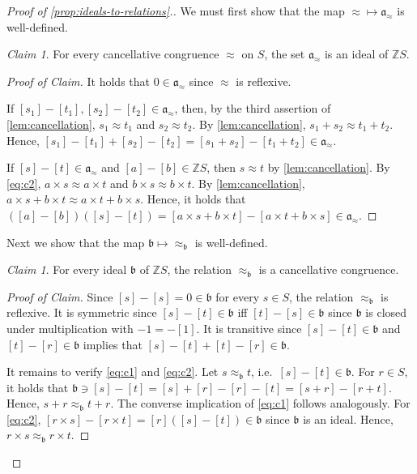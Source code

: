 \documentclass[11pt]{scrartcl}
\theoremstyle{definition}
\theoremstyle{plain}
\theoremstyle{remark}
\newtheorem{claim}[definition]{Claim}
\newenvironment{claimproof}[1][Proof of Claim]{\begin{proof}[#1] \renewcommand{\qedsymbol}{$\lrcorner$}}{ \end{proof}}
\begin{document}
	\begin{proof}[Proof of \cref{prop:ideals-to-relations}.]
		We must first show that the map  ${\approx} \mapsto \mathfrak{a}_{\approx }$ is well-defined.
		\begin{claim}
			For every cancellative congruence $\approx$ on $S$,
			the set $\mathfrak{a}_{\approx}$ is an ideal of $\mathbb{Z}S$.
		\end{claim}
		\begin{claimproof}
			It holds that $0 \in \mathfrak{a}_{\approx}$ since $\approx$ is reflexive. 

			If $[s_1] - [t_1], [s_2] - [t_2] \in \mathfrak{a}_{\approx}$,
			then, by the third assertion of \cref{lem:cancellation}, 
			$s_1 \approx t_1$ and $s_2 \approx t_2$.
			By \cref{lem:cancellation},
			$s_1 + s_2 \approx t_1 + t_2$.
			Hence, $[s_1] - [t_1]+ [s_2] - [t_2] = [s_1 + s_2] - [t_1 + t_2] \in \mathfrak{a}_{\approx}$.

			If $[s] - [t] \in \mathfrak{a}_{\approx}$
			and $[a] - [b] \in \mathbb{Z}S$,
			then $s \approx t$ by \cref{lem:cancellation}.
			By \eqref{eq:c2},
			$a \times s \approx a \times t$
			and 
			$b \times s \approx b \times t$.
			By \cref{lem:cancellation},
			\(
			a\times s + b \times t \approx a \times t + b \times s.
			\)
			Hence, it holds that
			$([a] - [b]) ([s] - [t]) = [a \times s + b \times t ] -  [a \times t + b \times s ] \in \mathfrak{a}_\approx$.
		\end{claimproof}

		Next we show that the map  $\mathfrak{b} \mapsto {\approx_{\mathfrak{b}}}$ is well-defined.
		
		\begin{claim}\label{claim:ideal-to-relation}
			For every ideal $\mathfrak{b}$ of $\mathbb{Z}S$,
			the relation $\approx_{\mathfrak{b}}$ is a cancellative congruence.
		\end{claim}
		\begin{claimproof}
			Since $[s] - [s] = 0 \in \mathfrak{b}$ for every $s\in S$,
			the relation $\approx_{\mathfrak{b}}$ is reflexive.
			It is symmetric since $[s] - [t] \in \mathfrak{b}$ iff $[t] - [s] \in \mathfrak{b}$ since $\mathfrak{b}$ is closed under multiplication with $-1 = -[1]$.
			It is transitive since $[s] - [t] \in \mathfrak{b}$ and $[t] - [r] \in \mathfrak{b}$ implies that $[s] - [t] + [t] - [r] \in \mathfrak{b}$.

			It remains to verify \eqref{eq:c1} and \eqref{eq:c2}.
			Let $s \approx_{\mathfrak{b}} t$, i.e.\ $[s] - [t] \in \mathfrak{b}$.
			For $r \in S$,
			it holds that
			$\mathfrak{b} \ni [s] - [t] = [s] + [r] - [r] - [t] = [s  +r ] - [r + t]$.
			Hence, $s +r \approx_{\mathfrak{b}} t + r$.
			The converse implication of \eqref{eq:c1} follows analogously.
For \eqref{eq:c2},
			$[r \times s] - [r \times t] = [r] ([s] - [t]) \in \mathfrak{b}$ since $\mathfrak{b}$ is an ideal.
			Hence, $r \times s \approx_{\mathfrak{b}} r \times t$.
		\end{claimproof}



\end{proof}
\end{document}
